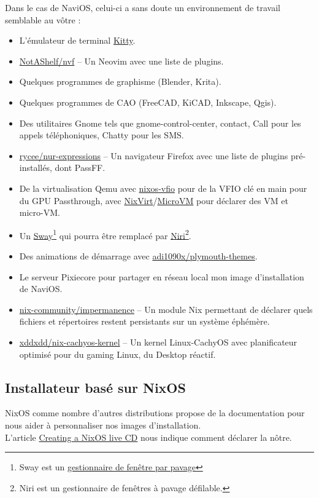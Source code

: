 \documentclass[a4paper,11pt]{article}
\begin{document}
\begin{blogmain}
Dans le cas de NaviOS, celui-ci a sans doute un environnement de travail semblable au vôtre :
\begin{itemize}
  \item L'émulateur de terminal \href{https://sw.kovidgoyal.net/kitty}{Kitty}.
  \item \href{https://github.com/NotAShelf/nvf}{NotAShelf/nvf} -- Un Neovim avec une liste de plugins.
  \item Quelques programmes de graphisme (Blender, Krita).
  \item Quelques programmes de CAO (FreeCAD, KiCAD, Inkscape, Qgis).
  \item Des utilitaires Gnome tels que gnome-control-center, contact, Call pour les appels téléphoniques, Chatty pour les SMS.
  \item \href{https://gitlab.com/rycee/nur-expressions?dir=pkgs/firefox-addons}{rycee/nur-expressions} -- Un navigateur Firefox avec une liste de plugins pré-installés, dont PassFF.
  \item De la virtualisation Qemu avec \href{https://github.com/j-brn/nixos-vfio}{nixos-vfio} pour de la VFIO clé en main pour du GPU Passthrough, avec \href{https://github.com/AshleyYakeley/NixVirt}{NixVirt}/\href{https://github.com/microvm-nix/microvm.nix}{MicroVM} pour déclarer des VM et micro-VM.
  \item Un \href{https://swaywm.org}{Sway}\footnote{Sway est un \href{https://fr.wikipedia.org/wiki/Gestionnaire_de_fen\%C3\%AAtres_par_pavage}{gestionnaire de fenêtre par pavage}} qui pourra être remplacé par \href{https://niri-wm.github.io/niri/}{Niri}\footnote{Niri est un gestionnaire de fenêtres à pavage défilable.}.
  \item Des animations de démarrage avec \href{https://github.com/adi1090x/plymouth-themes}{adi1090x/plymouth-themes}.
  \item Le serveur Pixiecore pour partager en réseau local mon image d'installation de NaviOS.
  \item \href{https://github.com/nix-community/impermanence}{nix-community/impermanence} -- Un module Nix permettant de déclarer quels fichiers et répertoires restent persistants sur un système éphémère.
  \item \href{https://github.com/xddxdd/nix-cachyos-kernel}{xddxdd/nix-cachyos-kernel} -- Un kernel Linux-CachyOS avec planificateur optimisé pour du gaming Linux, du Desktop réactif.
\end{itemize}

\newpage
\subsection{Installateur basé sur NixOS}
NixOS comme nombre d'autres distributions propose de la documentation pour nous aider à personnaliser nos images d’installation. \\
L'article \href{https://wiki.nixos.org/wiki/Creating_a_NixOS_live_CD}{Creating a NixOS live CD} nous indique comment déclarer la nôtre.


\end{blogmain}
\end{document}
